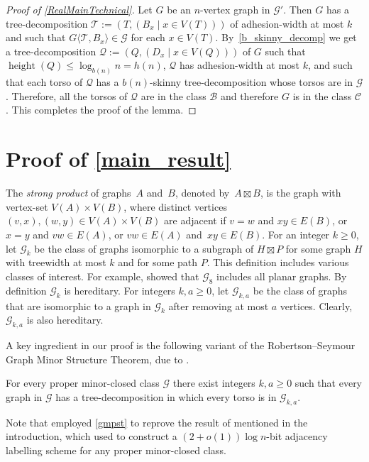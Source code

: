 \documentclass{patmorin}
\renewcommand{\le}{\leqslant}
\renewcommand{\geq}{\geqslant}
\newcommand{\defin}[1]{\emph{\textcolor{brightmaroon}{#1}}}
\newcommand{\torso}[2]{{#1}\langle{#2}\rangle}
\DeclareMathOperator{\height}{height}
\newcommand{\calB}{\mathcal{B}}
\newcommand{\calC}{\mathcal{C}}
\newcommand{\calG}{\mathcal{G}}
\newcommand{\calQ}{\mathcal{Q}}
\newcommand{\calT}{\mathcal{T}}
\begin{document}
\begin{proof}[Proof of \cref{RealMainTechnical}]
    Let $G$ be an $n$-vertex graph in $\calG'$.
    Then $G$ has a tree-decomposition $\calT:=(T,(B_x\mid x\in V(T)))$ of adhesion-width at most $k$ and such that $\torso{G}{\calT,B_x}\in\calG$ for each $x\in V(T)$.
By~\cref{b_skinny_decomp} we get a tree-decomposition $\calQ:=(Q,(D_x \mid x\in V(Q)))$ of $G$ such that $\height(Q)\le\log_{b(n)} n = h(n)$, $\calQ$ has adhesion-width at most $k$, and such that each torso of $\calQ$ has a $b(n)$-skinny tree-decomposition whose torsos are in $\calG$.
Therefore, all the torsos of $\calQ$ are in the class $\calB$ and therefore $G$ is in the class $\calC$.  This completes the proof of the lemma.
\end{proof}


  \section{Proof of \cref{main_result}}
  \label{gpmst_section}

The \defin{strong product} of graphs~$A$ and~$B$, denoted by~${A \boxtimes B}$, is the graph with vertex-set ${V(A) \times V(B)}$, where distinct vertices ${(v,x),(w,y) \in V(A) \times V(B)}$ are adjacent if
	${v=w}$ and ${xy \in E(B)}$, or
	${x=y}$ and ${vw \in E(A)}$, or
	${vw \in E(A)}$ and~${xy \in E(B)}$.
For an integer $k\geq 0$, let \defin{$\calG_{k}$} be the class of graphs isomorphic to a subgraph of $H\boxtimes P$ for some graph $H$ with treewidth at most $k$ and for some path $P$. This definition includes various classes of interest. For example, \citet{dujmovic.joret.ea:planar} showed that
$\calG_{8}$ includes all planar graphs.
By definition $\calG_k$ is hereditary.
For integers $k,a\geq 0$, let \defin{$\calG_{k,a}$} be the class of graphs that are isomorphic to a graph in $\calG_k$ after removing at most $a$ vertices.
Clearly, $\calG_{k,a}$ is also hereditary.

A key ingredient in our proof is the following variant of the Robertson--Seymour Graph Minor Structure Theorem, due to \citet{dujmovic.joret.ea:planar}.
 \begin{thm}
  \label{gmpst}
  For every proper minor-closed class $\calG$ there exist integers $k,a\geq 0$ such that every graph in $\calG$ has a tree-decomposition in which every torso is in $\calG_{k,a}$.
  \end{thm}

Note that \citet{dujmovic.joret.ea:planar} employed \cref{gmpst} to reprove the result of \citet{devos2004} mentioned in the introduction, which \citet{gavoille.labourel:shorter} used to construct a ${(2+o(1))\log n}$-bit adjacency labelling scheme for any proper minor-closed class.
\end{document}
